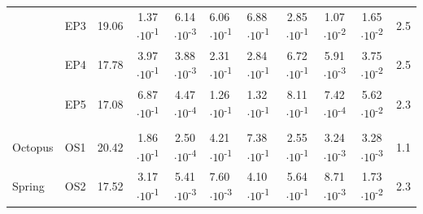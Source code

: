 \begin{landscape}
\begin{table}
\begin{adjustbox}{width=600pt,keepaspectratio}
\begin{threeparttable}
\begin{tabular}{lccccllcccc}
      & EP3   & 19.06 & 1.37$\cdot 10$\textsuperscript{-1} & 6.14$\cdot 10$\textsuperscript{-3} & 6.06$\cdot 10$\textsuperscript{-1} & 6.88$\cdot 10$\textsuperscript{-1} & 2.85$\cdot 10$\textsuperscript{-1} & 1.07$\cdot 10$\textsuperscript{-2} & 1.65$\cdot 10$\textsuperscript{-2} & 2.5 \\
      & EP4   & 17.78 & 3.97$\cdot 10$\textsuperscript{-1} & 3.88$\cdot 10$\textsuperscript{-3} & 2.31$\cdot 10$\textsuperscript{-1} & 2.84$\cdot 10$\textsuperscript{-1} & 6.72$\cdot 10$\textsuperscript{-1} & 5.91$\cdot 10$\textsuperscript{-3} & 3.75$\cdot 10$\textsuperscript{-2} & 2.5 \\
      & EP5   & 17.08 & 6.87$\cdot 10$\textsuperscript{-1} & 4.47$\cdot 10$\textsuperscript{-4} & 1.26$\cdot 10$\textsuperscript{-1} & 1.32$\cdot 10$\textsuperscript{-1} & 8.11$\cdot 10$\textsuperscript{-1} & 7.42$\cdot 10$\textsuperscript{-4} & 5.62$\cdot 10$\textsuperscript{-2} & 2.3 \\
      &       &       &       &       &       &       &       &       &       &  \\
Octopus & OS1   & 20.42 & 1.86$\cdot 10$\textsuperscript{-1} & 2.50$\cdot 10$\textsuperscript{-4} & 4.21$\cdot 10$\textsuperscript{-1} & 7.38$\cdot 10$\textsuperscript{-1} & 2.55$\cdot 10$\textsuperscript{-1} & 3.24$\cdot 10$\textsuperscript{-3} & 3.28$\cdot 10$\textsuperscript{-3} & 1.1 \\
Spring & OS2   & 17.52 & 3.17$\cdot 10$\textsuperscript{-1} & 5.41$\cdot 10$\textsuperscript{-3} & 7.60$\cdot 10$\textsuperscript{-3} & 4.10$\cdot 10$\textsuperscript{-1} & 5.64$\cdot 10$\textsuperscript{-1} & 8.71$\cdot 10$\textsuperscript{-3} & 1.73$\cdot 10$\textsuperscript{-2} & 2.3 \\
\bottomrule
\end{tabular}%









\begin{tablenotes}


\end{tablenotes}

  \label{tab:mods}
  \end{threeparttable}
  \end{adjustbox}
\end{table}

\end{landscape}
\doublespace






